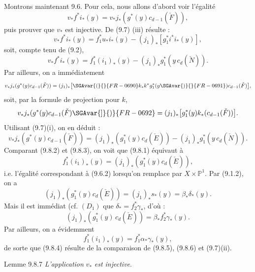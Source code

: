 Montrons maintenant 9.6. Pour cela, nous allons d'abord voir l'égalité
\[
v_*f^*i_*(y)=v_*j_*(g^*(y)c_{d-1}(\check F)),
\tag{9.8.1}
\]
puis prouver que $v_*$ est injective. De (9.7) (iii) résulte :
\[
v_*f^*i_*(y)=f_1^*u_*i_*(y)-(j_1)_*[g_1^*i^*i_*(y)],
\]
soit, compte tenu de (9.2),
\[
v_*f^*i_*(y)=f_1^*(i_1)_*(y)-(j_1)_*g_1^*(y\,c_d(\check N)).
\tag{9.8.2}
\]
Par ailleurs, on a immédiatement
\[
v_*j_*(g^*(y)c_{d-1}(\check F))
=(j_1)_*\bigl[\SGAvar{(}{}{FR-0690}k_*k^*g_1^*(y\SGAvar{)}{}{FR-0691})c_{d-1}(\check F)\bigr],
\]
soit, par la formule de projection pour $k$,
\[
v_*j_*(g^*(y)c_{d-1}(\check F)\SGAvar{]}{)}{FR-0692}
=(j_1)_*\bigl[g_1^*(y)k_*(c_{d-1}(\check F))\bigr].
\]
Utilisant (9.7)(i), on en déduit :
\[
v_*j_*(g^*(y)c_{d-1}(\check F))
=(j_1)_*(g_1^*(y)c_d(\check E))-(j_1)_*g_1^*(y\,c_d(\check N)).
\tag{9.8.3}
\]
Comparant (9.8.2) et (9.8.3), on voit que (9.8.1) équivaut à
\[
f_1^*(i_1)_*(y)=(j_1)_*(g_1^*(y)c_d(\check E)),
\tag{9.8.4}
\]
i.e. l'égalité correspondant à (9.6.2) lorsqu'on remplace par $X\times\mathbb{P}^1$. Par (9.1.2), on a
\[
(j_1)_*(g_1^*(y)c_d(\check E))=(j_1)_*s_*(y)=\beta_*\delta_*(y).
\]
Mais il est immédiat (cf. $(D_1)$ que $\delta_*=f_2^*\gamma_*$, d'où :
\[
(j_1)_*(g_1^*(y)\,c_d(\check E))=\beta_*f_2^*\gamma_*(y).
\tag{9.8.5}
\]
Par ailleurs, on a évidemment
\[
f_1^*(i_1)_*(y)=f_1^*\alpha_*\gamma_*(y),
\tag{9.8.6}
\]
de sorte que (9.8.4) résulte de la comparaison de (9.8.5), (9.8.6) et (9.7)(ii).

\begin{statement}{Lemme 9.8.7}
\emph{L'application} $v_*$ \emph{est injective}.
\end{statement}

